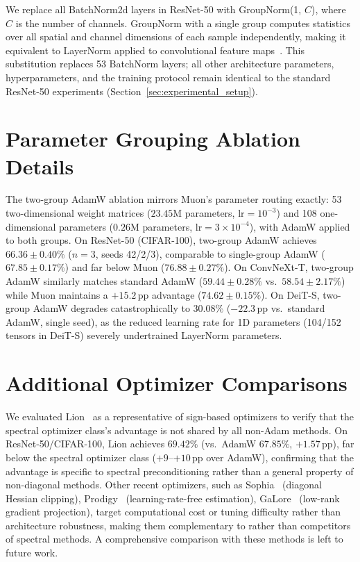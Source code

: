 We replace all BatchNorm2d layers in ResNet-50 with GroupNorm(1, $C$), where $C$ is the number of channels.
GroupNorm with a single group computes statistics over all spatial and channel dimensions of each sample independently, making it equivalent to LayerNorm applied to convolutional feature maps~\cite{wu2018group}.
This substitution replaces 53 BatchNorm layers; all other architecture parameters, hyperparameters, and the training protocol remain identical to the standard ResNet-50 experiments (Section~\ref{sec:experimental_setup}).

\section{Parameter Grouping Ablation Details}\label{sec:ablation_details}

The two-group AdamW ablation mirrors Muon's parameter routing exactly: 53 two-dimensional weight matrices ($23.45$M parameters, $\text{lr}{=}10^{-3}$) and 108 one-dimensional parameters ($0.26$M parameters, $\text{lr}{=}3{\times}10^{-4}$), with AdamW applied to both groups.
On ResNet-50 (CIFAR-100), two-group AdamW achieves $66.36 \pm 0.40\%$ ($n{=}3$, seeds 42/2/3), comparable to single-group AdamW ($67.85 \pm 0.17\%$) and far below Muon ($76.88 \pm 0.27\%$).
On ConvNeXt-T, two-group AdamW similarly matches standard AdamW ($59.44 \pm 0.28\%$ vs.\ $58.54 \pm 2.17\%$) while Muon maintains a $+15.2$\,pp advantage ($74.62 \pm 0.15\%$).
On DeiT-S, two-group AdamW degrades catastrophically to $30.08\%$ ($-22.3$\,pp vs.\ standard AdamW, single seed), as the reduced learning rate for 1D parameters (104/152 tensors in DeiT-S) severely undertrained LayerNorm parameters.
\section{Additional Optimizer Comparisons}\label{sec:additional_optimizers}

We evaluated Lion~\cite{chen2024lion} as a representative of sign-based optimizers to verify that the spectral optimizer class's advantage is not shared by all non-Adam methods.
On ResNet-50/CIFAR-100, Lion achieves $69.42\%$ (vs.\ AdamW $67.85\%$, $+1.57$\,pp), far below the spectral optimizer class ($+9$--$+10$\,pp over AdamW), confirming that the advantage is specific to spectral preconditioning rather than a general property of non-diagonal methods.
Other recent optimizers, such as Sophia~\cite{liu2024sophia} (diagonal Hessian clipping), Prodigy~\cite{mishchenko2024prodigy} (learning-rate-free estimation), GaLore~\cite{zhao2024galore} (low-rank gradient projection), target computational cost or tuning difficulty rather than architecture robustness, making them complementary to rather than competitors of spectral methods.
A comprehensive comparison with these methods is left to future work.

